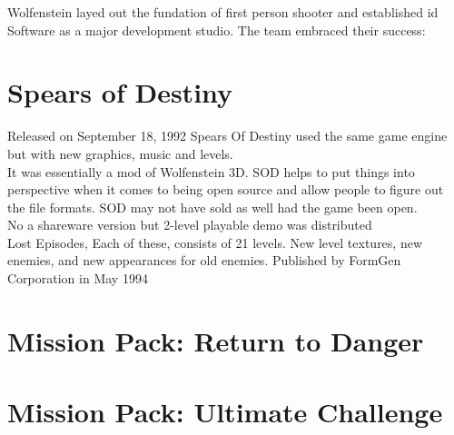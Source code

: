 \documentclass[book.tex]{subfiles}
\begin{document}
Wolfenstein layed out the fundation of first person shooter and established id Software as a major development studio. The team embraced their success:


\section{Spears of Destiny}
Released on September 18, 1992 Spears Of Destiny used the same game engine but with new graphics, music and levels.\\
It was essentially a mod of Wolfenstein 3D. SOD helps to put things into perspective when it comes to being open source and allow people to figure out the file formats. SOD may not have sold as well had the game been open.\\
No a shareware version  but  2-level playable demo was distributed\\
Lost Episodes, Each of these, consists of 21 levels. New level textures, new enemies, and new appearances for old enemies. Published by FormGen Corporation in May 1994
\section{Mission Pack: Return to Danger}
\section{Mission Pack: Ultimate Challenge}
\end{document}
